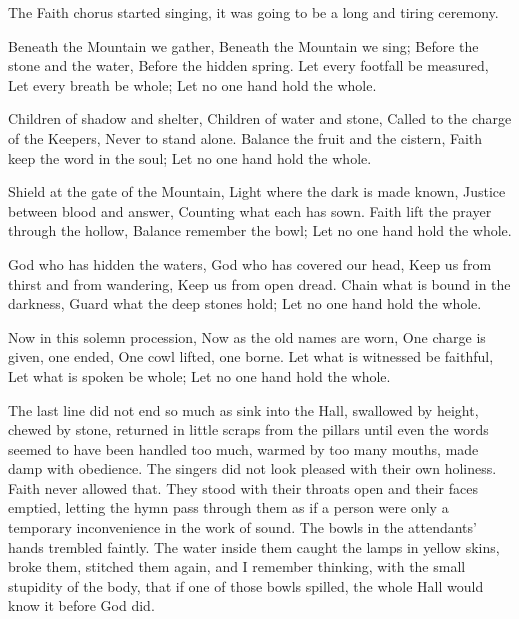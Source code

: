 
The Faith chorus started singing, it was going to be a long and tiring ceremony.

\begin{scripture}
Beneath the Mountain we gather,
Beneath the Mountain we sing;
Before the stone and the water,
Before the hidden spring.
Let every footfall be measured,
Let every breath be whole;
Let no one hand hold the whole.

Children of shadow and shelter,
Children of water and stone,
Called to the charge of the Keepers,
Never to stand alone.
Balance the fruit and the cistern,
Faith keep the word in the soul;
Let no one hand hold the whole.

Shield at the gate of the Mountain,
Light where the dark is made known,
Justice between blood and answer,
Counting what each has sown.
Faith lift the prayer through the hollow,
Balance remember the bowl;
Let no one hand hold the whole.

God who has hidden the waters,
God who has covered our head,
Keep us from thirst and from wandering,
Keep us from open dread.
Chain what is bound in the darkness,
Guard what the deep stones hold;
Let no one hand hold the whole.

Now in this solemn procession,
Now as the old names are worn,
One charge is given, one ended,
One cowl lifted, one borne.
Let what is witnessed be faithful,
Let what is spoken be whole;
Let no one hand hold the whole.
\end{scripture}


The last line did not end so much as sink into the Hall, swallowed by height, chewed by stone, returned in little scraps from the pillars until even the words 
seemed to have been handled too much, warmed by too many mouths, made damp with obedience. 
The singers did not look pleased with their own holiness. 
Faith never allowed that. They stood with their throats open and their faces emptied, letting the hymn pass through them as if a person were only a temporary 
inconvenience in the work of sound. 
The bowls in the attendants’ hands trembled faintly. 
The water inside them caught the lamps in yellow skins, broke them, stitched them again, and I remember thinking, with the small stupidity of the body, 
that if one of those bowls spilled, the whole Hall would know it before God did. \par

